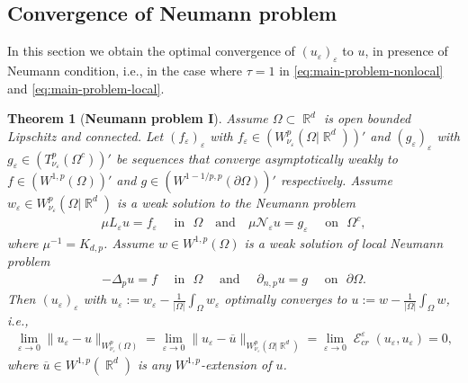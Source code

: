 \documentclass[12pt, reqno]{amsart}%
\theoremstyle{plain}  %
\newtheorem{theorem}{Theorem}[section]
\theoremstyle{definition}  %
\numberwithin{equation}{section}
\DeclareMathOperator{\cE}{\mathcal{E}}
\DeclareMathOperator{\R}{\mathbb{R}}
\newcommand{\eps}{\varepsilon}
\newcommand{\WnuOmRa}{W^p_{\nu_\eps}(\Omega|\R^d )}
\begin{document}
\subsection{Convergence of Neumann problem}
In this section we obtain  the optimal convergence of $(u_\eps)_\eps$ to $u$, in presence of Neumann condition, i.e., in the case where $\tau=1$ in \eqref{eq:main-problem-nonlocal} and \eqref{eq:main-problem-local}.

\begin{theorem}[\textbf{Neumann problem I}]\label{thm:convergence-neumann} Assume $\Omega\subset \R^d$ is open bounded Lipschitz and connected. Let $ (f_\eps)_\eps$ with  $f_\eps\in  (W^{p}_{\nu_\eps}(\Omega|\R^d))'$ and $ (g_\eps)_\eps$ with $g_\eps\in  (T^{p}_{\nu_\eps}(\Omega^c))'$  be sequences that converge asymptotically weakly to  $f\in (W^{1,p}(\Omega))'$ and
$g\in( W^{1-1/p ,p}(\partial\Omega))'$ respectively.
Assume  $w_\eps \in  \WnuOmRa$ is a weak solution to the Neumann problem
\begin{align*}
\mu L_\eps u = f_\eps \quad \text{ in } \,\,\Omega
\quad \text{and} \quad
\mu \mathcal{N}_\eps u = g_\eps
\quad \text{ on } \,\,\Omega^c ,
\end{align*}
where $\mu^{-1}=K_{d,p}$. Assume $w \in W^{1,p}(\Omega)$ is a  weak solution of local Neumann problem
\begin{align*}
-\Delta_p u = f \quad \text{ in } \,\, \Omega \quad\text{ and }\quad
\partial_{n,p} u = g \quad \text{ on }\,\, \partial\Omega.
\end{align*}
Then  $(u_\eps)_\eps$ with $u_\eps :=w_\eps- \frac{1}{|\Omega|}
\int_\Omega w_\eps$ optimally  converges  to $u:=w- \frac{1}{|\Omega|}\int_\Omega w$, i.e.,
\begin{align}
\lim_{\eps\to0}\|u_\eps -u\|_{W^p_{\nu_\eps}(\Omega)} = \lim_{\eps\to0}\|u_\eps- \overline{u}\|_{W^p_{\nu_\eps}(\Omega|\R^d)}=\lim_{\eps\to0}\cE^\eps_{cr}(u_\eps, u_\eps)=0,
\end{align}
where $\overline{u}\in W^{1,p}(\R^d)$ is any $W^{1,p}$-extension of $u$.
\end{theorem}
\end{document}
